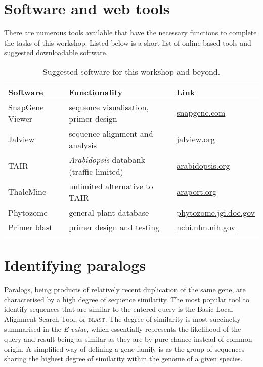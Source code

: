 \documentclass[11pt]{article}
\begin{document}
 	\section*{Software and web tools}
 	
 	There are numerous tools available that have the necessary functions to complete the tasks of this workshop. Listed below is a short list of online based tools and suggested downloadable software.
 	
 	\begin{table}[h!]
 	\footnotesize
 	\caption{Suggested software for this workshop and beyond.}
 	\label{tab:software}
 	\centering
 	\begin{tabular}{@{}lll}
 		\toprule
 		Software & Functionality & Link \\
 		\midrule
 		SnapGene Viewer	& sequence visualisation, primer design & \href{https://www.snapgene.com/snapgene-viewer/}{snapgene.com} \\ 
 		Jalview & sequence alignment and analysis & \href{http://www.jalview.org/getdown/release/#}{jalview.org}\\
 		TAIR & \textit{Arabidopsis} databank (traffic limited) & \href{https://www.arabidopsis.org}{arabidopsis.org} \\ 
 		ThaleMine & unlimited alternative to TAIR &  \href{https://apps.araport.org/thalemine/begin.do}{araport.org} \\ 
 		Phytozome & general plant database & \href{https://phytozome.jgi.doe.gov/pz/portal.html#}{phytozome.jgi.doe.gov}\\ 
 		Primer blast & primer design and testing & \href{https://www.ncbi.nlm.nih.gov/tools/primer-blast/}{ncbi.nlm.nih.gov} \\
 		\bottomrule
 	\end{tabular}
  	\end{table}
 
	\section{Identifying paralogs\label{sec:find}}
	
	Paralogs, being products of relatively recent duplication of the same gene, are characterised by a high degree of sequence similarity. 
	The most popular tool to identify sequences that are similar to the entered query is the Basic Local Alignment Search Tool, or \textsc{blast}. 
	The degree of similarity is most succinctly summarised in the \textit{E-value}, which essentially represents the likelihood of the query and result being as similar as they are by pure chance instead of common origin.
	A simplified way of defining a gene family is as the group of sequences sharing the highest degree of similarity within the genome of a given species.
	
\end{document}
